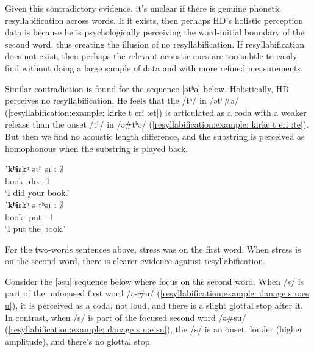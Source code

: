 Given this contradictory evidence, it's unclear if there is genuine phonetic resyllabification across words. If it exists, then perhaps HD's holistic perception data is because he is psychologically perceiving the word-initial boundary of the second word, thus creating the illusion of no resyllabification. If resyllabification does not exist, then perhaps the relevant acoustic cues are too subtle to easily find without doing a large sample of data and with more refined measurements. 

Similar contradiction is found for the sequence [ətʰə] below. Holistically, HD perceives no resyllabification. He feels that the /tʰ/ in /ətʰ\#ə/ (\ref{resyllabification:example: kirke t eri :et}) is articulated as a coda with a weaker   release than the onset /tʰ/ in /ə\#tʰə/ (\ref{resyllabification:example: kirke t eri :te}). But then we find no acoustic length difference, and the substring is perceived as homophonous when the substring is played back. 


\begin{exe}
	\ex 
	\begin{xlist}
		\ex \gll \underline{ˈ\textbf{kʰiɾ}kʰ-ətʰ}  əɾ-i-$\emptyset$ \\
		book-{\possSsg} do.{\aorperf}-{\pst}-1{\sg} \\
		\trans `I did your book.' \label{resyllabification:example: kirke t eri :et} \\
		\ex \gll \underline{ˈ\textbf{kʰiɾ}kʰ-ə}  tʰəɾ-i-$\emptyset$ \\
		book-{} put.{\aorperf}-{\pst}-1{\sg} \\
		\trans `I put the book.' \label{resyllabification:example: kirke t eri :te} \\
	\end{xlist}
\end{exe}

For the two-words sentences above, stress was on the first word. When stress is on the second word, there is clearer evidence against   resyllabification. 

Consider the [əsu] sequence below where focus on the second word. When /s/ is part of the unfocused first  word /əs\#u/ (\ref{resyllabification:example: danage s u:es u}), it is perceived as a coda, not loud, and there is a slight glottal stop after it. In contrast, when /s/ is part of the focused second word /ə\#su/ (\ref{resyllabification:example: danage s u:e su}), the /s/ is an onset, louder (higher amplitude), and there's no glottal stop. 


